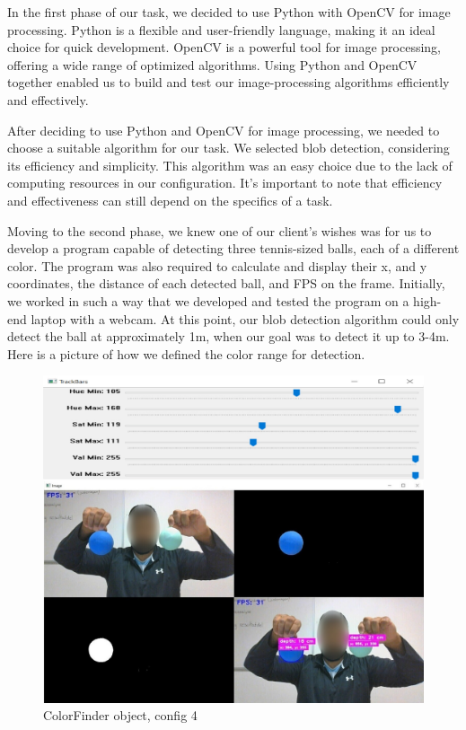 In the first phase of our task, we decided to use Python with OpenCV for image processing. Python is a flexible and user-friendly language, making it an ideal choice for quick development. OpenCV is a powerful tool for image processing, offering a wide range of optimized algorithms. Using Python and OpenCV together enabled us to build and test our image-processing algorithms efficiently and effectively. 

After deciding to use Python and OpenCV for image processing, we needed to choose a suitable algorithm for our task. We selected blob detection, considering its efficiency and simplicity. This algorithm was an easy choice due to the lack of computing resources in our configuration. It’s important to note that efficiency and effectiveness can still depend on the specifics of a task. 

Moving to the second phase, we knew one of our client's wishes was for us to develop a program capable of detecting three tennis-sized balls, each of a different color. The program was also required to calculate and display their x, and y coordinates, the distance of each detected ball, and FPS on the frame. Initially, we worked in such a way that we developed and tested the program on a high-end laptop with a webcam. At this point, our blob detection algorithm could only detect the ball at approximately 1m, when our goal was to detect it up to 3-4m. Here is a picture of how we defined the color range for detection. 

\begin{figure}[H]
    \centering
    \includegraphics[scale=0.5]{fig/HsvColor.jpg}
    \caption{ColorFinder object, config 4}
    \label{fig:config4_color}
\end{figure}

